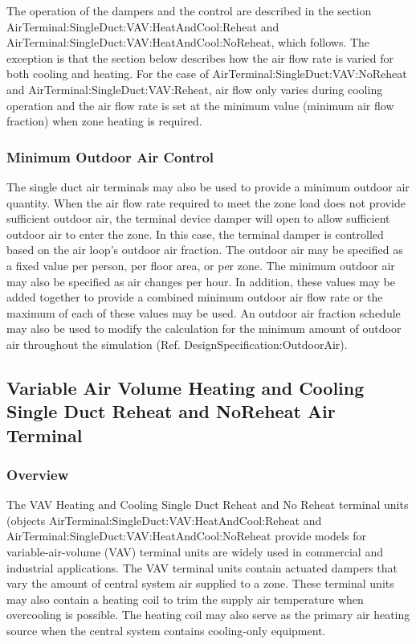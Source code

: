 The operation of the dampers and the control are described in the section AirTerminal:SingleDuct:VAV:HeatAndCool:Reheat and \\ AirTerminal:SingleDuct:VAV:HeatAndCool:NoReheat, which follows. The exception is that the section below describes how the air flow rate is varied for both cooling and heating. For the case of AirTerminal:SingleDuct:VAV:NoReheat and AirTerminal:SingleDuct:VAV:Reheat, air flow only varies during cooling operation and the air flow rate is set at the minimum value (minimum air flow fraction) when zone heating is required.

\subsubsection{Minimum Outdoor Air Control}\label{minimum-outdoor-air-control}

The single duct air terminals may also be used to provide a minimum outdoor air quantity. When the air flow rate required to meet the zone load does not provide sufficient outdoor air, the terminal device damper will open to allow sufficient outdoor air to enter the zone. In this case, the terminal damper is controlled based on the air loop's outdoor air fraction. The outdoor air may be specified as a fixed value per person, per floor area, or per zone. The minimum outdoor air may also be specified as air changes per hour. In addition, these values may be added together to provide a combined minimum outdoor air flow rate or the maximum of each of these values may be used. An outdoor air fraction schedule may also be used to modify the calculation for the minimum amount of outdoor air throughout the simulation (Ref. DesignSpecification:OutdoorAir).

\subsection{Variable Air Volume Heating and Cooling Single Duct Reheat and NoReheat Air Terminal}\label{variable-air-volume-heating-and-cooling-single-duct-reheat-and-noreheat-air-terminal}

\subsubsection{Overview}\label{overview-001}

The VAV Heating and Cooling Single Duct Reheat and No Reheat terminal units (objects AirTerminal:SingleDuct:VAV:HeatAndCool:Reheat and Air\-Ter\-minal:\-Single\-Duct:\-VAV:\-Heat\-And\-Cool:\-No\-Re\-heat provide models for variable-air-volume (VAV) terminal units are widely used in commercial and industrial applications. The VAV terminal units contain actuated dampers that vary the amount of central system air supplied to a zone. These terminal units may also contain a heating coil to trim the supply air temperature when overcooling is possible. The heating coil may also serve as the primary air heating source when the central system contains cooling-only equipment.


